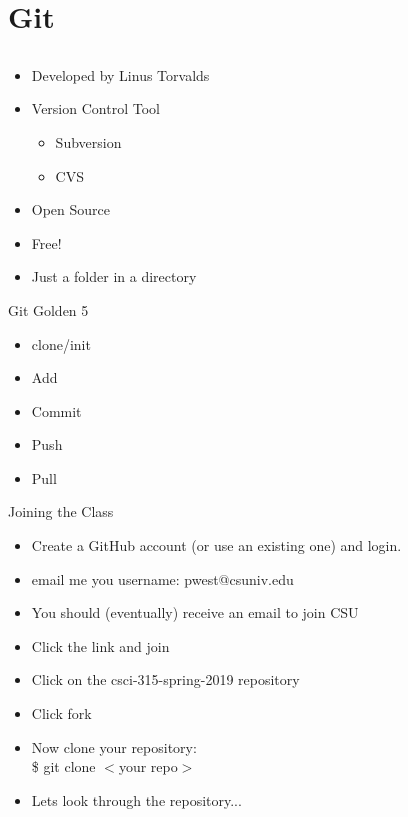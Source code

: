 \documentclass{beamer}
\begin{document}
\section{Git}
\subsection{}
\begin{frame}{}
\begin{itemize}
\item Developed by Linus Torvalds
\item Version Control Tool
\begin{itemize}
\item Subversion
\item CVS
\end{itemize}
\item Open Source 
\item Free!
\item Just a folder in a directory
\end{itemize}
\end{frame}

\begin{frame}{Git Golden 5}
\begin{itemize}
\item clone/init
\item Add
\item Commit
\item Push
\item Pull
\end{itemize}
\end{frame}

\begin{frame}{Joining the Class}
\begin{itemize}
\item Create a GitHub account (or use an existing one) and login.
\item email me you username: pwest@csuniv.edu
\item You should (eventually) receive an email to join CSU
\item Click the link and join
\item Click on the csci-315-spring-2019 repository
\item Click fork
\item Now clone your repository:\\
\$ git clone $<$your repo$>$
\item Lets look through the repository...
\end{itemize}
\end{frame}
\end{document}
